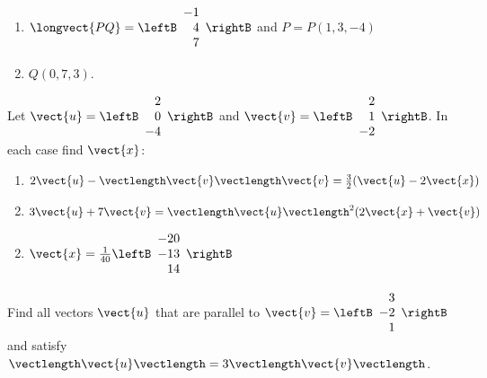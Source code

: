 \begin{multicols}{2}
\begin{ex}
\begin{enumerate}[label={\alph*.}]
\item
$\longvect{PQ} = \leftB
\begin{array}{r}
-1\\
4\\
7
\end{array}
\rightB$
and
$P = P(1,3,-4)
$


\end{enumerate}
\begin{sol}
\begin{enumerate}[label={\alph*.}]
\setcounter{enumi}{1}
\item  $Q(0, 7, 3)$.

\end{enumerate}
\end{sol}
\end{ex}


\begin{ex}
Let 
$\vect{u} = \leftB
\begin{array}{r}
2\\
0\\
-4
\end{array}
\rightB$
and 
$\vect{v} = \leftB
\begin{array}{r}
2\\
1\\
-2
\end{array}
\rightB$. In each case find $\vect{x}$:


\begin{enumerate}[label={\alph*.}]
\item $2\vect{u} - \vectlength \vect{v} \vectlength \vect{v} = \frac{3}{2}(\vect{u} - 2\vect{x})$

\item $3\vect{u} + 7\vect{v} = \vectlength\vect{u}\vectlength^{2}(2\vect{x} + \vect{v})$

\end{enumerate}
\begin{sol}
\begin{enumerate}[label={\alph*.}]
\setcounter{enumi}{1}
\item
$\vect{x} = \frac{1}{40}\leftB
\begin{array}{r}
-20\\
-13\\
14
\end{array}
\rightB$

\end{enumerate}
\end{sol}
\end{ex}

\begin{ex}
Find all vectors $\vect{u}$ that are parallel to 
$\vect{v} = \leftB
\begin{array}{r}
3\\
-2\\
1
\end{array}
\rightB$ 
and satisfy $\vectlength\vect{u}\vectlength = 3\vectlength\vect{v}\vectlength$.
\end{ex}


\end{multicols}
